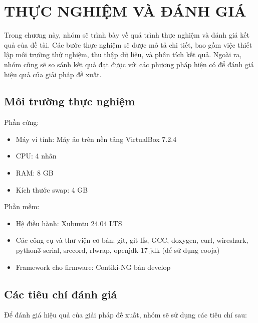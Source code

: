 \section{THỰC NGHIỆM VÀ ĐÁNH GIÁ}
\label{sec:ch5}
Trong chương này, nhóm sẽ trình bày về quá trình thực nghiệm và đánh giá kết quả của đề tài. Các bước thực nghiệm sẽ được mô tả chi tiết, bao gồm việc thiết lập môi trường thử nghiệm, thu thập dữ liệu, và phân tích kết quả. Ngoài ra, nhóm cũng sẽ so sánh kết quả đạt được với các phương pháp hiện có để đánh giá hiệu quả của giải pháp đề xuất.

\subsection{Môi trường thực nghiệm}
Phần cứng:
\begin{itemize}
    \item Máy vi tính: Máy ảo trên nền tảng VirtualBox 7.2.4
    \item CPU: 4 nhân
    \item RAM: 8 GB
    \item Kích thước swap: 4 GB
\end{itemize}

Phần mềm:
\begin{itemize}
    \item Hệ điều hành: Xubuntu 24.04 LTS
    \item Các công cụ và thư viện cơ bản: git, git-lfs, GCC, doxygen, curl, wireshark, python3-serial, srecord, rlwrap, openjdk-17-jdk (để sử dụng cooja)
    \item Framework cho firmware: Contiki-NG bản develop
\end{itemize}

\subsection{Các tiêu chí đánh giá}
Để đánh giá hiệu quả của giải pháp đề xuất, nhóm sẽ sử dụng các tiêu chí sau:

